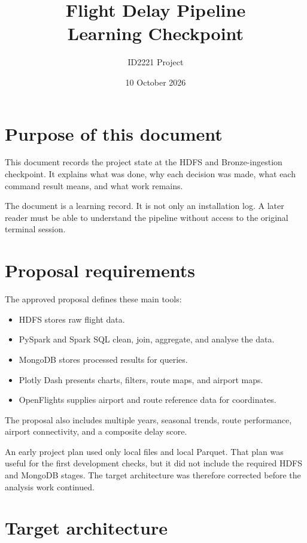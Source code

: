 \documentclass[11pt,a4paper]{article}
\title{Flight Delay Pipeline\\Learning Checkpoint}
\author{ID2221 Project}
\date{10 October 2026}
\begin{document}
\maketitle
\tableofcontents
\newpage

\section{Purpose of this document}

This document records the project state at the HDFS and Bronze-ingestion checkpoint. It explains what was done, why each decision was made, what each command result means, and what work remains.

The document is a learning record. It is not only an installation log. A later reader must be able to understand the pipeline without access to the original terminal session.

\section{Proposal requirements}

The approved proposal defines these main tools:

\begin{itemize}[leftmargin=*]
  \item HDFS stores raw flight data.
  \item PySpark and Spark SQL clean, join, aggregate, and analyse the data.
  \item MongoDB stores processed results for queries.
  \item Plotly Dash presents charts, filters, route maps, and airport maps.
  \item OpenFlights supplies airport and route reference data for coordinates.
\end{itemize}

The proposal also includes multiple years, seasonal trends, route performance, airport connectivity, and a composite delay score.

An early project plan used only local files and local Parquet. That plan was useful for the first development checks, but it did not include the required HDFS and MongoDB stages. The target architecture was therefore corrected before the analysis work continued.

\section{Target architecture}
\end{document}

